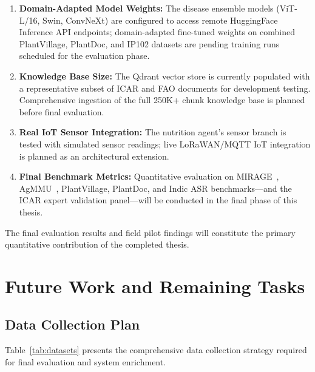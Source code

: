 \documentclass[12pt,a4paper]{article}
\begin{document}
\begin{enumerate}[itemsep=0pt,parsep=0pt,topsep=2pt]
\item \textbf{Domain-Adapted Model Weights:} The disease ensemble models (ViT-L/16, Swin, ConvNeXt) are configured to access remote HuggingFace Inference API endpoints; domain-adapted fine-tuned weights on combined PlantVillage, PlantDoc, and IP102 datasets are pending training runs scheduled for the evaluation phase.

\item \textbf{Knowledge Base Size:} The Qdrant vector store is currently populated with a representative subset of ICAR and FAO documents for development testing. Comprehensive ingestion of the full 250K+ chunk knowledge base is planned before final evaluation.

\item \textbf{Real IoT Sensor Integration:} The nutrition agent's sensor branch is tested with simulated sensor readings; live LoRaWAN/MQTT IoT integration is planned as an architectural extension.

\item \textbf{Final Benchmark Metrics:} Quantitative evaluation on MIRAGE~\cite{mirage2025}, AgMMU~\cite{agmmu2025}, PlantVillage, PlantDoc, and Indic ASR benchmarks---and the ICAR expert validation panel---will be conducted in the final phase of this thesis.
\end{enumerate}

The final evaluation results and field pilot findings will constitute the primary quantitative contribution of the completed thesis.


\clearpage
\section{Future Work and Remaining Tasks}

\subsection{Data Collection Plan}

Table~\ref{tab:datasets} presents the comprehensive data collection strategy required for final evaluation and system enrichment.
\end{document}
